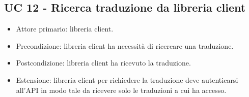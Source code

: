 \subsection{UC 12 - Ricerca traduzione da libreria client}
    \begin{itemize}
        \item Attore primario: libreria client.
        \item Precondizione: libreria client ha necessità di ricercare una traduzione.
        \item Postcondizione: libreria client ha ricevuto la traduzione.
        \item Estensione: libreria client per richiedere la traduzione deve autenticarsi all'API in modo tale da ricevere solo le traduzioni a cui ha accesso.
    \end{itemize}


